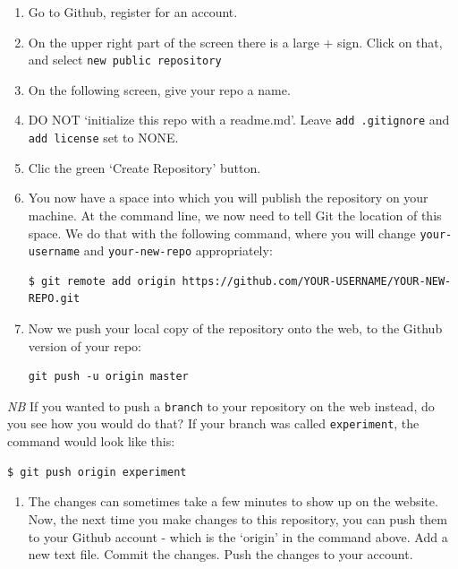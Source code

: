 \documentclass[english,]{book}
\providecommand{\tightlist}{%
  \setlength{\itemsep}{0pt}\setlength{\parskip}{0pt}}
\begin{document}
\begin{enumerate}
\def\labelenumi{\alph{enumi}.}
\item
  Go to Github, register for an account.
\item
  On the upper right part of the screen there is a large + sign. Click
  on that, and select \texttt{new\ public\ repository}
\item
  On the following screen, give your repo a name.
\item
  DO NOT `initialize this repo with a readme.md'. Leave
  \texttt{add\ .gitignore} and \texttt{add\ license} set to NONE.
\item
  Clic the green `Create Repository' button.
\item
  You now have a space into which you will publish the repository on
  your machine. At the command line, we now need to tell Git the
  location of this space. We do that with the following command, where
  you will change \texttt{your-username} and \texttt{your-new-repo}
  appropriately:

\begin{verbatim}
$ git remote add origin https://github.com/YOUR-USERNAME/YOUR-NEW-REPO.git
\end{verbatim}
\item
  Now we push your local copy of the repository onto the web, to the
  Github version of your repo:

\begin{verbatim}
git push -u origin master
\end{verbatim}
\end{enumerate}

\emph{NB} If you wanted to push a \texttt{branch} to your repository on
the web instead, do you see how you would do that? If your branch was
called \texttt{experiment}, the command would look like this:

\begin{verbatim}
$ git push origin experiment
\end{verbatim}

\begin{enumerate}
\def\labelenumi{\alph{enumi}.}
\setcounter{enumi}{7}
\tightlist
\item
  The changes can sometimes take a few minutes to show up on the
  website. Now, the next time you make changes to this repository, you
  can push them to your Github account - which is the `origin' in the
  command above. Add a new text file. Commit the changes. Push the
  changes to your account.
\end{enumerate}
\end{document}
